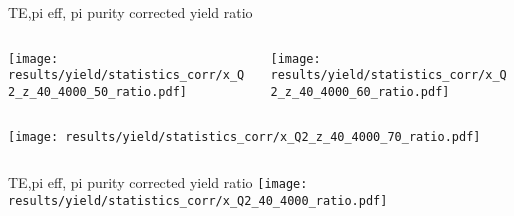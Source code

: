 \begin{frame}{TE,pi eff, pi purity corrected yield ratio}
\begin{columns}
\begin{column}[T]{0.5\textwidth}
\texttt{[image: results/yield/statistics\_corr/x\_Q2\_z\_40\_4000\_50\_ratio.pdf]}
\end{column}
\begin{column}[T]{0.5\textwidth}
\texttt{[image: results/yield/statistics\_corr/x\_Q2\_z\_40\_4000\_60\_ratio.pdf]}
\end{column}
\end{columns}
\begin{columns}
\begin{column}[T]{0.5\textwidth}
\texttt{[image: results/yield/statistics\_corr/x\_Q2\_z\_40\_4000\_70\_ratio.pdf]}
\end{column}
\begin{column}[T]{0.5\textwidth}
\end{column}
\end{columns}
\end{frame}
\begin{frame}{TE,pi eff, pi purity corrected yield ratio}
\texttt{[image: results/yield/statistics\_corr/x\_Q2\_40\_4000\_ratio.pdf]}
\end{frame}
